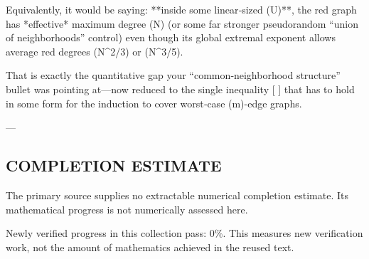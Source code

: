 Equivalently, it would be saying: **inside some linear‑sized (U)**, the red graph has *effective* maximum degree (\ll \sqrt N) (or some far stronger pseudorandom “union of neighborhoods” control) even though its global extremal exponent allows average red degrees (N^{2/3}) or (N^{3/5}).

That is exactly the quantitative gap your “common‑neighborhood structure” bullet was pointing at—now reduced to the single inequality
[
]
that has to hold in some form for the induction to cover worst‑case (m)-edge graphs.

---


\subsection*{COMPLETION ESTIMATE}
The primary source supplies no extractable numerical completion estimate. Its mathematical progress is not numerically assessed here.

Newly verified progress in this collection pass: $0\%$. This measures new verification work, not the amount of mathematics achieved in the reused text.
